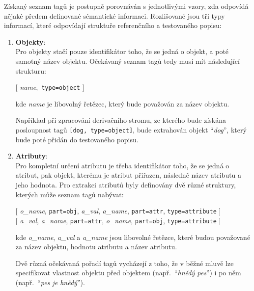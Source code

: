 Získaný seznam tagů je postupně porovnáván s jednotlivými vzory, zda odpovídá nějaké předem definované sémantické informaci.
Rozlišované jsou tři typy informací, které odpovídají struktuře referenčního a testovaného popisu:
\begin{enumerate}
	\item \textbf{Objekty}: \\
	      Pro objekty stačí pouze identifikátor toho, že se jedná o objekt, a poté samotný název objektu.
	      Očekávaný seznam tagů tedy musí mít následující strukturu:
	      \begin{center}
		      $\bigl[ $ \emph{name},\ {\texttt{type=object}} $\bigr]$
	      \end{center}
	      kde \emph{name} je libovolný řetězec, který bude považován za název objektu.

	      Například při zpracování derivačního stromu, ze kterého bude získána posloupnost tagů
	      \texttt{[dog, type=object]},
	      bude extrahován objekt \enquote{\emph{dog}}, který bude poté přidán do testovaného popisu.
	\item \textbf{Atributy}: \\
	      Pro kompletní určení atributu je třeba identifikátor toho, že se jedná o atribut,
	      pak objekt, kterému je atribut přiřazen, následně název atributu a jeho hodnota.
	      Pro extrakci atributů byly definovány dvě různé struktury, kterých může seznam tagů nabývat:
	      \begin{center}
		      $\bigl[$ \emph{o\_name}, {\texttt{part=obj}}, \emph{a\_val}, \emph{a\_name},
					      {\texttt{part=attr}}, {\texttt{type=attribute}} $\bigr]$ \\
		      $\bigl[$ \emph{a\_val}, \emph{a\_name}, {\texttt{part=attr}}, \emph{o\_name},
					      {\texttt{part=obj}}, {\texttt{type=attribute}} $\bigr]$
	      \end{center}
	      kde \emph{o\_name}, \emph{a\_val} a \emph{a\_name} jsou libovolné řetězce, které budou považované za název objektu,
	      hodnotu atributu a název atributu.

	      Dvě různá očekávaná pořadí tagů vycházejí z toho, že v běžné mluvě lze specifikovat vlastnost objektu
	      před objektem (např.~\enquote{\emph{hnědý pes}}) i po něm (např.~\enquote{\emph{pes je hnědý}}).


\end{enumerate}
